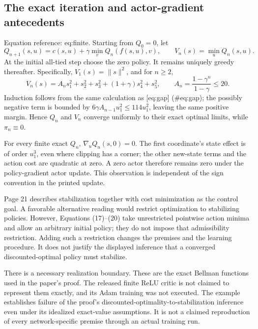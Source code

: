 \documentclass[10pt]{article}
\begin{document}
\subsection*{The exact iteration and actor-gradient antecedents}
Equation reference: eq:finite. Starting from \(Q_0=0\), let \[Q_{n+1}(s,u)=c(s,u)+\gamma\min_vQ_n(f(s,u),v),
 \qquad V_n(s)=\min_u Q_n(s,u).\] At the initial all-tied step choose the zero policy. It remains uniquely greedy thereafter. Specifically, \(V_1(s)=\|s\|^2\), and for \(n\ge2\), \[
 V_n(s)=A_n s_1^2+s_2^2+s_3^2+(1+\gamma)s_4^2+s_5^2,
 \qquad A_n=\frac{1-\gamma^n}{1-\gamma}\le20.\] Induction follows from the same calculation as [eq:gap] (\#eq:gap); the possibly negative term is bounded by \(6\gamma A_{n-1}u_1^2\le114u_1^2\), leaving the same positive margin. Hence \(Q_n\) and \(V_n\) converge uniformly to their exact optimal limits, while \(\pi_n\equiv0\).\par
For every finite exact \(Q_n\), \(\nabla_uQ_n(s,0)=0\). The first coordinate’s state effect is of order \(u_1^3\), even where clipping has a corner; the other new-state terms and the action cost are quadratic at zero. A zero actor therefore remains zero under the policy-gradient actor update. This observation is independent of the sign convention in the printed update.\par
Page 21 describes stabilization together with cost minimization as the control goal. A favorable alternative reading would restrict optimization to stabilizing policies. However, Equations (17)–(20) take unrestricted pointwise action minima and allow an arbitrary initial policy; they do not impose that admissibility restriction. Adding such a restriction changes the premises and the learning procedure. It does not justify the displayed inference that a converged discounted-optimal policy must stabilize.\par
There is a necessary realization boundary. These are the exact Bellman functions used in the paper’s proof. The released finite ReLU critic is not claimed to represent them exactly, and its Adam training was not executed. The example establishes failure of the proof’s discounted-optimality-to-stabilization inference even under its idealized exact-value assumptions. It is not a claimed reproduction of every network-specific premise through an actual training run.\par
\end{document}
